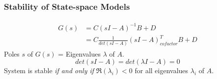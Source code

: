 \subsubsection{Stability of State-space Models}
\begin{align*}
\begin{split}
    G(s) &= C(sI-A)^{-1}B+D \\
    &=C\frac{1}{det(sI-A)}(sI-A)^{T}_{cofactor}B+D
\end{split}
\end{align*}
Poles $s$ of $G(s)$ = Eigenvalues $\lambda$ of $A$.
\[det(sI-A) = det(\lambda I-A) = 0\]
System is stable \textit{if and only if} $\Re (\lambda_{i})<0$ for all eigenvalues $\lambda_{i}$ of $A$.
 
 
